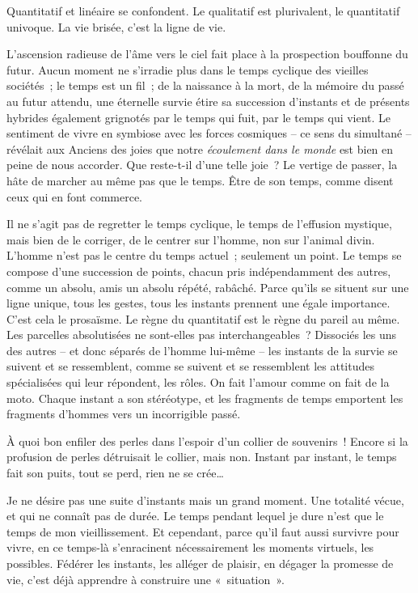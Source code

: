 \documentclass[french,twoside]{book} %
\begin{document}
\noindent Quantitatif et linéaire se confondent. Le qualitatif est plurivalent, le quantitatif univoque. La vie brisée, c’est la ligne de vie.\par
L’ascension radieuse de l’âme vers le ciel fait place à la prospection bouffonne du futur. Aucun moment ne s’irradie plus dans le temps cyclique des vieilles sociétés ; le temps est un fil ; de la naissance à la mort, de la mémoire du passé au futur attendu, une éternelle survie étire sa succession d’instants et de présents hybrides également grignotés par le temps qui fuit, par le temps qui vient. Le sentiment de vivre en symbiose avec les forces cosmiques – ce sens du simultané – révélait aux Anciens des joies que notre \emph{écoulement dans le monde} est bien en peine de nous accorder. Que reste-t-il d’une telle joie ? Le vertige de passer, la hâte de marcher au même pas que le temps. Être de son temps, comme disent ceux qui en font commerce.\par
Il ne s’agit pas de regretter le temps cyclique, le temps de l’effusion mystique, mais bien de le corriger, de le centrer sur l’homme, non sur l’animal divin. L’homme n’est pas le centre du temps actuel ; seulement un point. Le temps se compose d’une succession de points, chacun pris indépendamment des autres, comme un absolu, amis un absolu répété, rabâché. Parce qu’ils se situent sur une ligne unique, tous les gestes, tous les instants prennent une égale importance. C’est cela le prosaïsme. Le règne du quantitatif est le règne du pareil au même. Les parcelles absolutisées ne sont-elles pas interchangeables ? Dissociés les uns des autres – et donc séparés de l’homme lui-même – les instants de la survie se suivent et se ressemblent, comme se suivent et se ressemblent les attitudes spécialisées qui leur répondent, les rôles. On fait l’amour comme on fait de la moto. Chaque instant a son stéréotype, et les fragments de temps emportent les fragments d’hommes vers un incorrigible passé.\par
À quoi bon enfiler des perles dans l’espoir d’un collier de souvenirs ! Encore si la profusion de perles détruisait le collier, mais non. Instant par instant, le temps fait son puits, tout se perd, rien ne se crée…\par
Je ne désire pas une suite d’instants mais un grand moment. Une totalité vécue, et qui ne connaît pas de durée. Le temps pendant lequel je dure n’est que le temps de mon vieillissement. Et cependant, parce qu’il faut aussi survivre pour vivre, en ce temps-là s’enracinent nécessairement les moments virtuels, les possibles. Fédérer les instants, les alléger de plaisir, en dégager la promesse de vie, c’est déjà apprendre à construire une « situation ».\par
\end{document}
